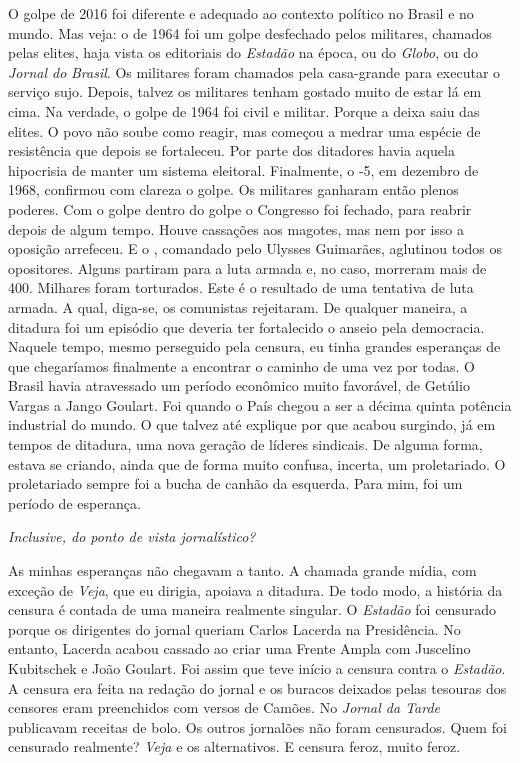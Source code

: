 \normalfont
O golpe de 2016 foi diferente e adequado ao contexto
político no Brasil e no mundo. Mas veja: o de 1964 foi um golpe
desfechado pelos militares, chamados pelas elites, haja vista os
editoriais do \emph{Estadão} na época, ou do \emph{Globo}, ou do
\emph{Jornal do} \emph{Brasil}. Os militares foram chamados pela
casa-grande para executar o serviço sujo. Depois, talvez os militares
tenham gostado muito de estar lá em cima. Na verdade, o golpe de 1964
foi civil e militar. Porque a deixa saiu das elites. O povo não soube
como reagir, mas começou a medrar uma espécie de resistência que depois
se fortaleceu. Por parte dos ditadores havia aquela hipocrisia de manter
um sistema eleitoral. Finalmente, o -5, em dezembro de 1968, confirmou
com clareza o golpe. Os militares ganharam então plenos poderes. Com o
golpe dentro do golpe o Congresso foi fechado, para reabrir depois de
algum tempo. Houve cassações aos magotes, mas nem por isso a oposição
arrefeceu. E o , comandado pelo Ulysses Guimarães, aglutinou todos os
opositores. Alguns partiram para a luta armada e, no caso, morreram mais
de 400. Milhares foram torturados. Este é o resultado de uma tentativa
de luta armada. A qual, diga-se, os comunistas rejeitaram. De qualquer
maneira, a ditadura foi um episódio que deveria ter fortalecido o anseio
pela democracia. Naquele tempo, mesmo perseguido pela censura, eu tinha
grandes esperanças de que chegaríamos finalmente a encontrar o caminho
de uma vez por todas. O Brasil havia atravessado um período econômico
muito favorável, de Getúlio Vargas a Jango Goulart. Foi quando o País
chegou a ser a décima quinta potência industrial do mundo. O que talvez
até explique por que acabou surgindo, já em tempos de ditadura, uma nova
geração de líderes sindicais. De alguma forma, estava se criando, ainda
que de forma muito confusa, incerta, um proletariado. O proletariado
sempre foi a bucha de canhão da esquerda. Para mim, foi um período de
esperança.

\itshape
 Inclusive, do ponto de vista jornalístico?

\normalfont
As minhas esperanças não chegavam a tanto. A chamada
grande mídia, com exceção de \emph{Veja}, que eu dirigia, apoiava a
ditadura. De todo modo, a história da censura é contada de uma maneira
realmente singular. O \emph{Estadão} foi censurado porque os dirigentes
do jornal queriam Carlos Lacerda na Presidência. No entanto, Lacerda
acabou cassado ao criar uma Frente Ampla com Juscelino Kubitschek e João
Goulart. Foi assim que teve início a censura contra o \emph{Estadão}. A
censura era feita na redação do jornal e os buracos deixados pelas
tesouras dos censores eram preenchidos com versos de Camões. No
\emph{Jornal da Tarde} publicavam receitas de bolo. Os outros jornalões
não foram censurados. Quem foi censurado realmente? \emph{Veja} e os
alternativos. E censura feroz, muito feroz.

